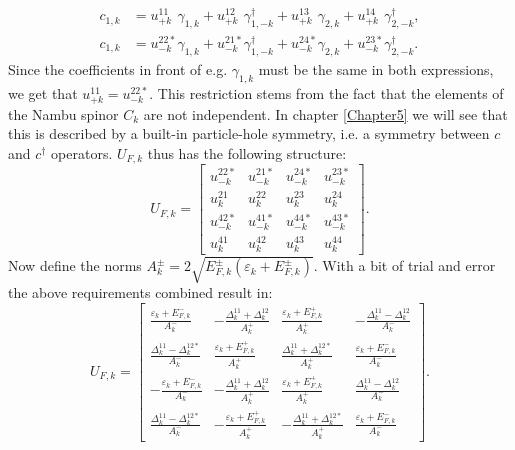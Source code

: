 \begin{align}
c_{1,k} &= u^{11\phantom{*}}_{+k} \gamma_{1,k} + u^{12\phantom{*}}_{+k} \gamma^\dagger_{1,-k} + u^{13\phantom{*}}_{+k} \gamma_{2,k} + u^{14\phantom{*}}_{+k} \gamma^\dagger_{2,-k}, \nonumber \\
c_{1,k} &= u^{22*}_{-k} \gamma_{1,k} + u^{21*}_{-k} \gamma^\dagger_{1,-k} + u^{24*}_{-k} \gamma_{2,k} + u^{23*}_{-k} \gamma^\dagger_{2,-k}. \nonumber
\end{align}
Since the coefficients in front of e.g. $\gamma_{1,k}$ must be the same in both expressions, we get that $u^{11}_{+k} = u^{22*}_{-k}$. This restriction stems from the fact that the elements of the Nambu spinor $C_k$ are not independent. In chapter \ref{Chapter5} we will see that this is described by a built-in particle-hole symmetry, i.e. a symmetry between $c$ and $c^\dagger$ operators. $U_{F,k}$ thus has the following structure:
\begin{equation}
U_{F,k} = \begin{bmatrix} 
u^{22*}_{-k} & u^{21*}_{-k} & u^{24*}_{-k} & u^{23*}_{-k}           \\  
u^{21}_k 	 & u^{22}_k 	& u^{23}_k 	   & u^{24}_k               \\ 
u^{42*}_{-k} & u^{41*}_{-k} & u^{44*}_{-k} & u^{43*}_{-k}           \\ 
u^{41}_k 	 & u^{42}_k 	& u^{43}_k 	   & u^{44}_k
\end{bmatrix}. \nonumber
\end{equation}
Now define the norms $A^{\pm}_k = 2 \sqrt{ E^{\pm}_{F,k}(\varepsilon_k + E^{\pm}_{F,k}) }$. With a bit of trial and error the above requirements combined result in:
\begin{equation}
U_{F,k} = \begin{bmatrix} 
\frac{\varepsilon_k + E^{-}_{F,k}}{A^{-}_k}    & -\frac{\Delta^{11}_k + \Delta^{12}_k}{A^{+}_k} & \frac{\varepsilon_k + E^{+}_{F,k}}{A^{+}_k}     & -\frac{\Delta^{11}_k - \Delta^{12}_k}{A^{-}_k}  \\  
\frac{\Delta^{11}_k - \Delta^{12*}_k}{A^{-}_k} & \frac{\varepsilon_k + E^{+}_{F,k}}{A^{+}_k}    & \frac{\Delta^{11}_k + \Delta^{12*}_k}{A^{+}_k}  & \frac{\varepsilon_k + E^{-}_{F,k}}{A^{-}_k}     \\ 
-\frac{\varepsilon_k + E^{-}_{F,k}}{A^{-}_k}   & -\frac{\Delta^{11}_k + \Delta^{12}_k}{A^{+}_k} & \frac{\varepsilon_k + E^{+}_{F,k}}{A^{+}_k}     & \frac{\Delta^{11}_k - \Delta^{12}_k}{A^{-}_k} \\ 
\frac{\Delta^{11}_k - \Delta^{12*}_k}{A^{-}_k} & -\frac{\varepsilon_k + E^{+}_{F,k}}{A^{+}_k}   & -\frac{\Delta^{11}_k + \Delta^{12*}_k}{A^{+}_k} & \frac{\varepsilon_k + E^{-}_{F,k}}{A^{-}_k} 
\end{bmatrix}. \nonumber
\end{equation}
